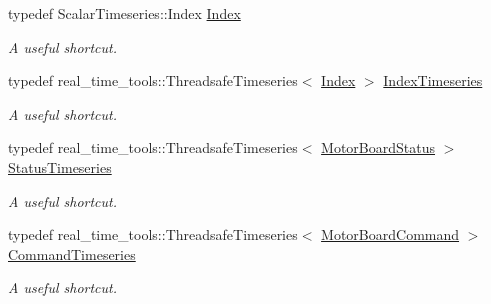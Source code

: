 \begin{DoxyCompactItemize}
\mbox{\label{classblmc__drivers_1_1MotorBoardInterface_ab0e201396fe808cbc480b69768c81fa2}} 
typedef Scalar\+Timeseries\+::\+Index \hyperlink{classblmc__drivers_1_1MotorBoardInterface_ab0e201396fe808cbc480b69768c81fa2}{Index}
\begin{DoxyCompactList}\small\item\em A useful shortcut. \end{DoxyCompactList}\item 
\mbox{\label{classblmc__drivers_1_1MotorBoardInterface_aef0ca990410b130b67abce74d20d58a5}} 
typedef real\+\_\+time\+\_\+tools\+::\+Threadsafe\+Timeseries$<$ \hyperlink{classblmc__drivers_1_1MotorBoardInterface_ab0e201396fe808cbc480b69768c81fa2}{Index} $>$ \hyperlink{classblmc__drivers_1_1MotorBoardInterface_aef0ca990410b130b67abce74d20d58a5}{Index\+Timeseries}
\begin{DoxyCompactList}\small\item\em A useful shortcut. \end{DoxyCompactList}\item 
\mbox{\label{classblmc__drivers_1_1MotorBoardInterface_ae3777e484dda60c4abe87f2b542ddfb8}} 
typedef real\+\_\+time\+\_\+tools\+::\+Threadsafe\+Timeseries$<$ \hyperlink{classblmc__drivers_1_1MotorBoardStatus}{Motor\+Board\+Status} $>$ \hyperlink{classblmc__drivers_1_1MotorBoardInterface_ae3777e484dda60c4abe87f2b542ddfb8}{Status\+Timeseries}
\begin{DoxyCompactList}\small\item\em A useful shortcut. \end{DoxyCompactList}\item 
\mbox{\label{classblmc__drivers_1_1MotorBoardInterface_ae2afe94a023d9f08a4c689e9b7660f15}} 
typedef real\+\_\+time\+\_\+tools\+::\+Threadsafe\+Timeseries$<$ \hyperlink{classblmc__drivers_1_1MotorBoardCommand}{Motor\+Board\+Command} $>$ \hyperlink{classblmc__drivers_1_1MotorBoardInterface_ae2afe94a023d9f08a4c689e9b7660f15}{Command\+Timeseries}
\begin{DoxyCompactList}\small\item\em A useful shortcut. \end{DoxyCompactList}\item 

\end{DoxyCompactItemize}
